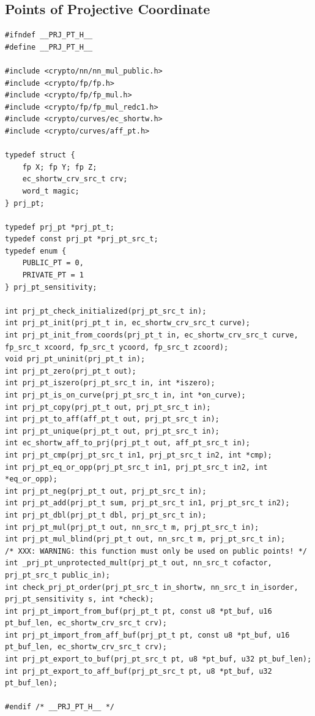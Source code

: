 \subsection{Points of Projective Coordinate}
\begin{lstlisting}[style=cstyle, caption={include/curves/prj\_pt.h}, captionpos=t]
#ifndef __PRJ_PT_H__
#define __PRJ_PT_H__

#include <crypto/nn/nn_mul_public.h>
#include <crypto/fp/fp.h>
#include <crypto/fp/fp_mul.h>
#include <crypto/fp/fp_mul_redc1.h>
#include <crypto/curves/ec_shortw.h>
#include <crypto/curves/aff_pt.h>

typedef struct {
	fp X; fp Y; fp Z;
	ec_shortw_crv_src_t crv;
	word_t magic;
} prj_pt;

typedef prj_pt *prj_pt_t;
typedef const prj_pt *prj_pt_src_t;
typedef enum {
	PUBLIC_PT = 0,
	PRIVATE_PT = 1
} prj_pt_sensitivity;

int prj_pt_check_initialized(prj_pt_src_t in);
int prj_pt_init(prj_pt_t in, ec_shortw_crv_src_t curve);
int prj_pt_init_from_coords(prj_pt_t in, ec_shortw_crv_src_t curve, fp_src_t xcoord, fp_src_t ycoord, fp_src_t zcoord);
void prj_pt_uninit(prj_pt_t in);
int prj_pt_zero(prj_pt_t out);
int prj_pt_iszero(prj_pt_src_t in, int *iszero);
int prj_pt_is_on_curve(prj_pt_src_t in, int *on_curve);
int prj_pt_copy(prj_pt_t out, prj_pt_src_t in);
int prj_pt_to_aff(aff_pt_t out, prj_pt_src_t in);
int prj_pt_unique(prj_pt_t out, prj_pt_src_t in);
int ec_shortw_aff_to_prj(prj_pt_t out, aff_pt_src_t in);
int prj_pt_cmp(prj_pt_src_t in1, prj_pt_src_t in2, int *cmp);
int prj_pt_eq_or_opp(prj_pt_src_t in1, prj_pt_src_t in2, int *eq_or_opp);
int prj_pt_neg(prj_pt_t out, prj_pt_src_t in);
int prj_pt_add(prj_pt_t sum, prj_pt_src_t in1, prj_pt_src_t in2);
int prj_pt_dbl(prj_pt_t dbl, prj_pt_src_t in);
int prj_pt_mul(prj_pt_t out, nn_src_t m, prj_pt_src_t in);
int prj_pt_mul_blind(prj_pt_t out, nn_src_t m, prj_pt_src_t in);
/* XXX: WARNING: this function must only be used on public points! */
int _prj_pt_unprotected_mult(prj_pt_t out, nn_src_t cofactor, prj_pt_src_t public_in);
int check_prj_pt_order(prj_pt_src_t in_shortw, nn_src_t in_isorder, prj_pt_sensitivity s, int *check);
int prj_pt_import_from_buf(prj_pt_t pt, const u8 *pt_buf, u16 pt_buf_len, ec_shortw_crv_src_t crv);
int prj_pt_import_from_aff_buf(prj_pt_t pt, const u8 *pt_buf, u16 pt_buf_len, ec_shortw_crv_src_t crv);
int prj_pt_export_to_buf(prj_pt_src_t pt, u8 *pt_buf, u32 pt_buf_len);
int prj_pt_export_to_aff_buf(prj_pt_src_t pt, u8 *pt_buf, u32 pt_buf_len);

#endif /* __PRJ_PT_H__ */
\end{lstlisting}
